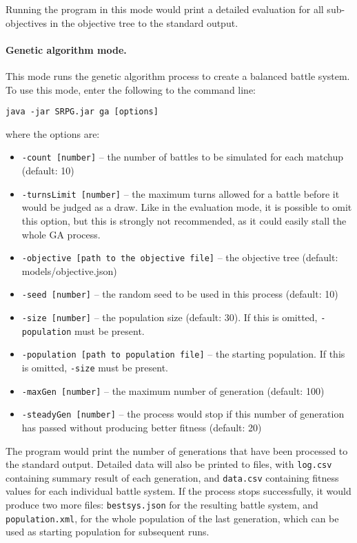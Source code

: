 Running the program in this mode would print a detailed evaluation for all sub-objectives in the objective tree to the standard output.

\paragraph{Genetic algorithm mode.} This mode runs the genetic algorithm process to create a balanced battle system. To use this mode, enter the following to the command line:
\begin{tcolorbox}
	\texttt{java -jar SRPG.jar ga [options]}
\end{tcolorbox}
where the options are:
\begin{itemize}
	\item \texttt{-count [number]} -- the number of battles to be simulated for each matchup (default: 10)
	\item \texttt{-turnsLimit [number]} -- the maximum turns allowed for a battle before it would be judged as a draw. Like in the evaluation mode, it is possible to omit this option, but this is strongly not recommended, as it could easily stall the whole GA process.
	\item \texttt{-objective [path to the objective file]} -- the objective tree (default: models/objective.json)
	\item \texttt{-seed [number]} -- the random seed to be used in this process (default: 10)
	\item \texttt{-size [number]} -- the population size (default: 30). If this is omitted, \texttt{-population} must be present.
	\item \texttt{-population [path to population file]} -- the starting population. If this is omitted, \texttt{-size} must be present.
	\item \texttt{-maxGen [number]} -- the maximum number of generation (default: 100)
	\item \texttt{-steadyGen [number]} -- the process would stop if this number of generation has passed without producing better fitness (default: 20)
\end{itemize}

The program would print the number of generations that have been processed to the standard output. Detailed data will also be printed to files, with \texttt{log.csv} containing summary result of each generation, and \texttt{data.csv} containing fitness values for each individual battle system. If the process stops successfully, it would produce two more files: \texttt{bestsys.json} for the resulting battle system, and \texttt{population.xml}, for the whole population of the last generation, which can be used as starting population for subsequent runs.


